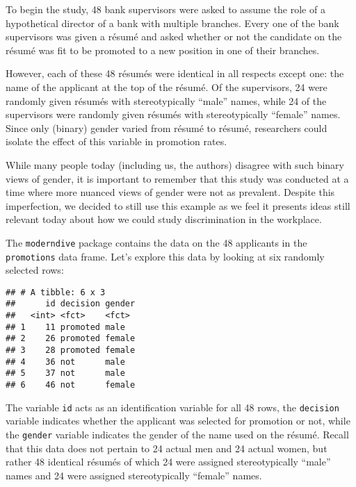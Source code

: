 \documentclass[
]{book}
\newenvironment{Shaded}{\begin{snugshade}}{\end{snugshade}}
\newcommand{\DataTypeTok}[1]{\textcolor[rgb]{0.13,0.29,0.53}{#1}}
\newcommand{\DecValTok}[1]{\textcolor[rgb]{0.00,0.00,0.81}{#1}}
\newcommand{\KeywordTok}[1]{\textcolor[rgb]{0.13,0.29,0.53}{\textbf{#1}}}
\newcommand{\NormalTok}[1]{#1}
\newcommand{\OperatorTok}[1]{\textcolor[rgb]{0.81,0.36,0.00}{\textbf{#1}}}
\newcommand{\StringTok}[1]{\textcolor[rgb]{0.31,0.60,0.02}{#1}}
\begin{document}
To begin the study, 48 bank supervisors were asked to assume the role of a hypothetical director of a bank with multiple branches. Every one of the bank supervisors was given a résumé and asked whether or not the candidate on the résumé was fit to be promoted to a new position in one of their branches.

However, each of these 48 résumés were identical in all respects except one: the name of the applicant at the top of the résumé. Of the supervisors, 24 were randomly given résumés with stereotypically ``male'' names, while 24 of the supervisors were randomly given résumés with stereotypically ``female'' names. Since only (binary) gender varied from résumé to résumé, researchers could isolate the effect of this variable in promotion rates.

While many people today (including us, the authors) disagree with such binary views of gender, it is important to remember that this study was conducted at a time where more nuanced views of gender were not as prevalent. Despite this imperfection, we decided to still use this example as we feel it presents ideas still relevant today about how we could study discrimination in the workplace.

The \texttt{moderndive} package contains the data on the 48 applicants in the \texttt{promotions} data frame. Let's explore this data by looking at six randomly selected rows:

\begin{Shaded}
\end{Shaded}

\begin{verbatim}
## # A tibble: 6 x 3
##      id decision gender
##   <int> <fct>    <fct> 
## 1    11 promoted male  
## 2    26 promoted female
## 3    28 promoted female
## 4    36 not      male  
## 5    37 not      male  
## 6    46 not      female
\end{verbatim}

The variable \texttt{id} acts as an identification variable for all 48 rows, the \texttt{decision} variable indicates whether the applicant was selected for promotion or not, while the \texttt{gender} variable indicates the gender of the name used on the résumé. Recall that this data does not pertain to 24 actual men and 24 actual women, but rather 48 identical résumés of which 24 were assigned stereotypically ``male'' names and 24 were assigned stereotypically ``female'' names.
\end{document}
